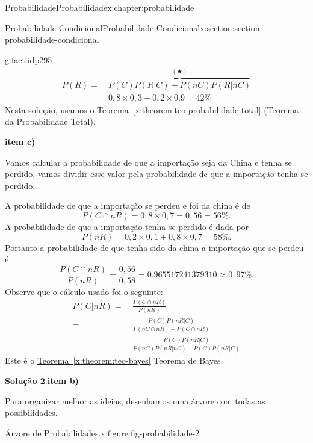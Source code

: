 \documentclass[oneside,10pt,]{book}
\newcommand{\blocktitlefont}{\relax}
\newcommand{\xreffont}{\relax}
\newcommand{\terminology}[1]{\textbf{#1}}
\numberwithin{equation}{section}
\newcommand{\amp}{&}
\begin{document}
\begin{chapterptx}{Probabilidade}{}{Probabilidade}{}{}{x:chapter:probabilidade}
\begin{sectionptx}{Probabilidade Condicional}{}{Probabilidade Condicional}{}{}{x:section:section-probabilidade-condicional}
\begin{fact}{}{}{g:fact:idp295}
\begin{align*}
P(R) = \amp ~ \overbrace{P(C)P(R|C) +P(nC)P(R|nC)}^{(\bigstar)} \\
= \amp ~ 0,8\times 0,3 + 0,2\times 0.9 = 42\%
\end{align*}
Nesta solução, usamos o \hyperref[x:theorem:teo-probabilidade-total]{Teorema~{\xreffont\ref{x:theorem:teo-probabilidade-total}}} (Teorema da Probabilidade Total).%
\par
\terminology{item c)}%
\par
Vamos calcular a probabilidade de que a importação seja da China e tenha se perdido, vamos dividir esse valor pela probabilidade de que a importação tenha se perdido.%
\par
A probabilidade de que a importação se perdeu e foi da china é de%
\begin{equation*}
P(C\cap nR) = 0,8\times 0,7 = 0,56 = 56\%. 
\end{equation*}
A probabilidade de que a importação tenha se perdido é dada por%
\begin{equation*}
P(nR) = 0,2\times 0,1 + 0,8\times 0,7 = 58\%.
\end{equation*}
Portanto a probabilidade de que tenha sido da china a  importação que se perdeu  é%
\begin{equation*}
\frac{P(C\cap nR)}{P(nR)} = \frac{0,56}{0,58} = 0.965517241379310 \approx 0,97\%.
\end{equation*}
Observe que o cálculo usado foi o seguinte:%
\begin{align*}
P(C|nR) = \amp ~\frac{P(C\cap nR)}{P(nR)} \\
= \amp ~ \frac{P(C)P(nR|C)}{P(nC\cap nR)+P(C\cap nR)}\\
= \amp ~ \frac{P(C)P(nR|C)}{P(nC)P(nR|nC)+P(C)P(nR|C)}
\end{align*}
Este é o \hyperref[x:theorem:teo-bayes]{Teorema~{\xreffont\ref{x:theorem:teo-bayes}}} Teorema de Bayes.%
\par\smallskip%
\noindent\textbf{\blocktitlefont Solução 2}.\quad{}\terminology{item b)}%
\par
Para organizar melhor as ideias, desenhamos uma árvore com todas as possibilidades.%
\begin{figureptx}{Árvore de Probabilidades.}{x:figure:fig-probabilidade-2}{}%
\begin{image}{0.2}{0.6}{0.2}%

\end{image}
\end{figureptx}
\end{fact}
\end{sectionptx}
\end{chapterptx}
\end{document}

